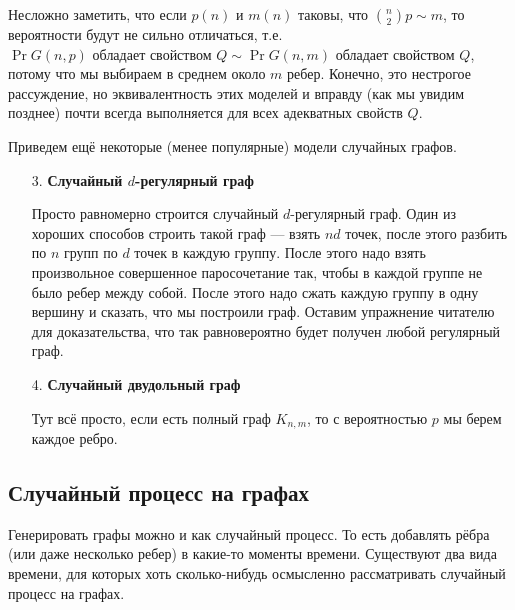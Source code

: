 Несложно заметить, что если $p(n)$ и $m(n)$ таковы, что $\binom{n}{2}p \sim m$,
то вероятности будут не сильно отличаться, т.е. $\Pr{G(n, p) \text{ обладает свойством $Q$}} \sim
\Pr{G(n, m) \text{ обладает свойством $Q$}}$, потому что мы выбираем в среднем
около $m$ ребер. Конечно, это нестрогое рассуждение, но эквивалентность этих
моделей и вправду (как мы увидим позднее) почти всегда выполняется для всех
адекватных свойств $Q$.

Приведем ещё некоторые (менее популярные) модели случайных графов.

\begin{itemize}
  \item[3.] \textbf{Случайный $d$-регулярный граф}

  Просто равномерно строится случайный $d$-регулярный граф. Один из хороших
  способов строить такой граф --- взять $nd$ точек, после этого разбить по $n$ групп
  по $d$ точек в каждую группу. После этого надо взять произвольное совершенное
  паросочетание так, чтобы в каждой группе не было ребер между собой. После этого
  надо сжать каждую группу в одну вершину и сказать, что мы построили граф.
  Оставим упражнение читателю для доказательства, что так равновероятно будет
  получен любой регулярный граф.

  \item[4.] \textbf{Случайный двудольный граф}

  Тут всё просто, если есть полный граф $K_{n, m}$, то с вероятностью $p$ мы
  берем каждое ребро.
\end{itemize}

\subsection{Случайный процесс на графах}

Генерировать графы можно и как случайный процесс. То есть добавлять рёбра 
(или даже несколько ребер) в какие-то
моменты времени. Существуют два вида времени, для которых хоть сколько-нибудь
осмысленно рассматривать случайный процесс на графах.

